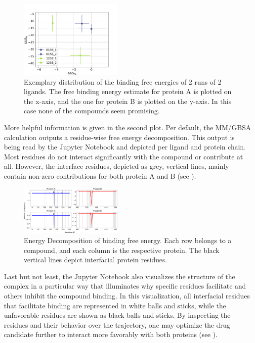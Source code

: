 \documentclass[9pt,tutorial]{livecoms}
\begin{document}
\begin{figure}[H]
    \centering
    \includegraphics[width=0.45\textwidth]{figures/dGAvsdGB.pdf}
    \caption{Exemplary distribution of the binding free energies of 2 runs of 2 ligands. The free binding energy estimate for protein A is plotted on the x-axis, and the one for protein B is plotted on the y-axis. In this case none of the compounds seem promising.}
    \label{fig:ligands_dGAvsdGB.png}
\end{figure}
More helpful information is given in the second plot. Per default, the MM/GBSA calculation outputs a residue-wise free energy decomposition. This output is being read by the Jupyter Notebook and depicted per ligand and protein chain. Most residues do not interact significantly with the compound or contribute at all. However, the interface residues, depicted as grey, vertical lines, mainly contain non-zero contributions for both protein A and B (see ).
\begin{figure}[H]
    \centering
    \includegraphics[width=0.45\textwidth]{figures/FE_ResidueDecomp.pdf}
    \caption{Energy Decomposition of binding free energy. Each row belongs to a compound, and each column is the respective protein. The black vertical lines depict interfacial protein residues.}
    \label{fig:FE_ResidueDecomp}
\end{figure}
Last but not least, the Jupyter Notebook also visualizes the structure of the complex in a particular way that illuminates why specific residues facilitate and others inhibit the compound binding. In this visualization, all interfacial residues that facilitate binding are represented in white balls and sticks, while the unfavorable residues are shown as black balls and sticks. By inspecting the residues and their behavior over the trajectory, one may optimize the drug candidate further to interact more favorably with both proteins (see ).
\end{document}
